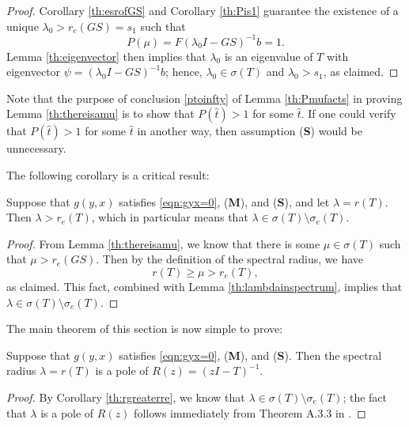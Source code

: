 \begin{proof}
	Corollary \ref{th:esrofGS} and Corollary \ref{th:Pis1} guarantee the existence of a unique $\lambda_0 > r_e(GS) = s_1$ such that
	\[P(\mu) = F(\lambda_0 I - GS)^{-1} b = 1.\]
	Lemma \ref{th:eigenvector} then implies that $\lambda_0$ is an eigenvalue of $T$ with eigenvector $\psi = (\lambda_0 I - GS)^{-1} b$; hence, $\lambda_0 \in \sigma(T)$ and $\lambda_0 > s_1$, as claimed.
	
\end{proof}

Note that the purpose of conclusion \eqref{ptoinfty} of Lemma \ref{th:Pmufacts} in proving Lemma \ref{th:thereisamu} is to show that $P(\hat t) > 1$ for some $\hat t$. If one could verify that $P(\hat t)>1$ for some $\hat t$ in another way, then assumption (\textbf{S}) would be unnecessary.

The following corollary is a critical result:

\begin{corollary} \label{th:rgreaterre}
	Suppose that $g(y, x)$ satisfies \eqref{eqn:gyx=0}, (\textbf{M}), and (\textbf{S}), and let $\lambda = r(T)$. Then $\lambda > r_e(T)$, which in particular means that $\lambda \in \sigma(T) \setminus \sigma_e(T)$.
\end{corollary}

\begin{proof}
	From Lemma \ref{th:thereisamu}, we know that there is some $\mu \in \sigma(T)$ such that $\mu > r_e(GS)$. Then by the definition of the spectral radius, we have
	\[r(T) \geq \mu > r_e(T),\]
	as claimed. This fact, combined with Lemma \ref{th:lambdainspectrum}, implies that $\lambda \in \sigma(T) \setminus \sigma_e(T)$.  
\end{proof}

The main theorem of this section is now simple to prove:

\begin{theorem} \label{th:pole}
	Suppose that $g(y, x)$ satisfies \eqref{eqn:gyx=0}, (\textbf{M}), and (\textbf{S}). Then the spectral radius $\lambda = r(T)$ is a pole of $R(z) = (zI-T)^{-1}$.
\end{theorem}

\begin{proof}
	By Corollary \ref{th:rgreaterre}, we know that $\lambda \in \sigma(T) \setminus \sigma_e(T)$; the fact that $\lambda$ is a pole of $R(z)$ follows immediately from Theorem A.3.3 in \cite{Clement1987}. 
\end{proof}

